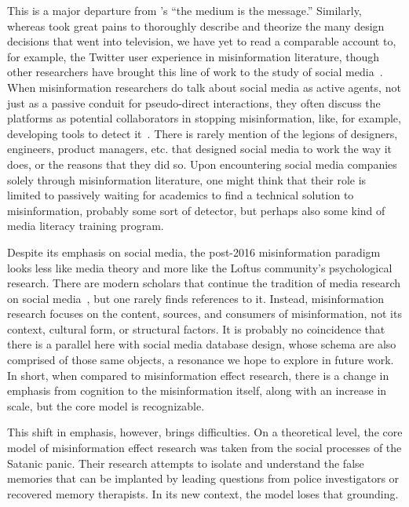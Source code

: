 \documentclass[          
 pre,
 twocolumn,
 twoside,
 superscriptaddress,
 amsmath,
 amssymb,                
 apsf
]{revtex4-2}
\begin{document}
This is a major departure from \citet{mcluhan_understanding_media_1964}'s ``the medium is the message.'' Similarly, whereas \citet{williamsTelevisionTechnologyCultural2004} took great pains to thoroughly describe and theorize the many design decisions that went into television, we have yet to read a comparable account to, for example, the Twitter user experience in misinformation literature, though other researchers have brought this line of work to the study of social media~\cite{scharlachVALUEAFFORDANCESSOCIAL2023}. When misinformation researchers do talk about social media as active agents, not just as a passive conduit for pseudo-direct interactions, they often discuss the platforms as potential collaborators in stopping misinformation, like, for example, developing tools to detect it~\cite{broda_misinformation_2024}. There is rarely mention of the legions of designers, engineers, product managers, etc. that designed social media to work the way it does, or the reasons that they did so. Upon encountering social media companies solely through misinformation literature, one might think that their role is limited to passively waiting for academics to find a technical solution to misinformation, probably some sort of detector, but perhaps also some kind of media literacy training program.

Despite its emphasis on social media, the post-2016 misinformation paradigm looks less like media theory and more like the Loftus community's psychological research. There are modern scholars that continue the tradition of media research on social media~\cite{eichhornContent2022, scharlachVALUEAFFORDANCESSOCIAL2023}, but one rarely finds references to it. Instead, misinformation research focuses on the content, sources, and consumers of misinformation, not its context, cultural form, or structural factors. It is probably no coincidence that there is a parallel here with social media database design, whose schema are also comprised of those same objects, a resonance we hope to explore in future work. In short, when compared to misinformation effect research, there is a change in emphasis from cognition to the misinformation itself, along with an increase in scale, but the core model is recognizable. 

This shift in emphasis, however, brings difficulties. On a theoretical level, the core model of misinformation effect research was taken from the social processes of the Satanic panic. Their research attempts to isolate and understand the false memories that can be implanted by leading questions from police investigators or recovered memory therapists. In its new context, the model loses that grounding.
\end{document}

